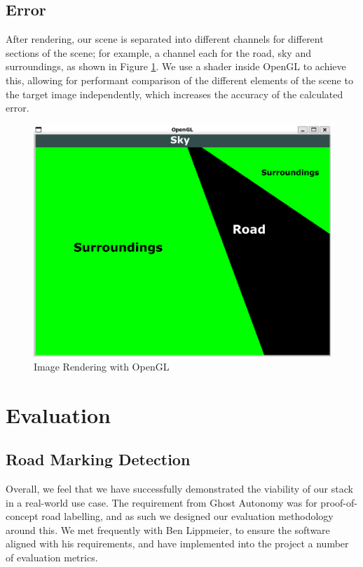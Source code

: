 \documentclass[conference]{IEEEtran}
\begin{document}
\subsection*{Error}

After rendering, our scene is separated into different channels for different sections of the scene; for example, a channel each for the road, sky and surroundings, as shown in Figure \ref{fig:imagerend}. We use a shader inside OpenGL to achieve this, allowing for performant comparison of the different elements of the scene to the target image independently, which increases the accuracy of the calculated error. 

\begin{figure}[h]
    \centering
    \includegraphics[width=\linewidth]{images/labelled render.png}
    \caption{Image Rendering with OpenGL}
    \label{fig:imagerend}
\end{figure}

\section{Evaluation}

\subsection*{Road Marking Detection}
Overall, we feel that we have successfully demonstrated the viability of our stack in a real-world use case. The requirement from Ghost Autonomy was for proof-of-concept road labelling, and as such we designed our evaluation methodology around this. We met frequently with Ben Lippmeier, to ensure the software aligned with his requirements, and have implemented into the project a number of evaluation metrics.
\end{document}
